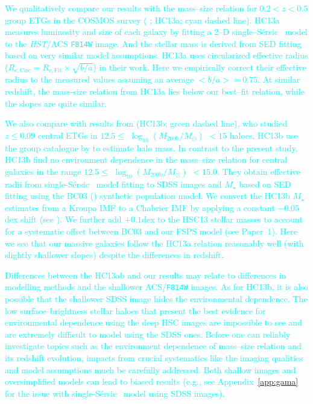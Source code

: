\documentclass[a4paper,fleqn,usenatbib]{mnras}
\def\ser{{S\'{e}rsic\ }}
\def\mstar{{$M_{\star}$}}
\def\logmh{{$\log_{10} (M_{\mathrm{200b}}/M_{\odot})$}}
\newcommand{\song}[1]{\textcolor{cyan}{#1}}
\begin{document}
    \song{
    We qualitatively compare our results with the mass--size relation for 
    $0.2 < z < 0.5$ group ETGs in the COSMOS survey (
    \citealt{HueartasCompany2013b}; HC13a; cyan dashed line).
    HC13a measures luminosity and size of each galaxy by fitting a 2--D 
    single--\ser{} model to the \textit{HST}/ACS \texttt{F814W} image. 
    And the stellar mass is derived from SED fitting based on very similar 
    model assumptions. 
    HC13a uses circularized effective radius 
    ($R_{\mathrm{e,Circ}} = R_{\mathrm{e,Fit}} \times \sqrt{b/a}$) in their work. 
    Here we empirically correct their effective radius to the measured values 
    assuming an average $<b/a>=0.75$.
    At similar redshift, the mass-size relation from HC13a lies below our 
    best--fit relation, while the slopes are quite similar.
    }
    
    \song{
    We also compare with results from \citealt{HCompany13} (HC13b; green dashed line), 
    who studied $z\leq 0.09$ central ETGs in $12.5 \le$ \logmh{} $< 15$ haloes. 
    HC13b use the group catalogue by \citet{Yang2007} to estimate halo mass. 
    In contrast to the present study, HC13b find no environment dependence in the 
    mass--size relation for central galaxies in the range $12.5\le$ \logmh{} $<15.0$. 
    They obtain effective radii from single-\ser{} model fitting to SDSS 
    images and \mstar{} based on SED fitting using the BC03 (\citealt{BC03}) 
    synthetic population model. 
    We convert the HC13b \mstar{} estimates from a Kroupa IMF to a Chabrier 
    IMF by applying a constant $-0.05$ dex shift (see \citealt{Bernardi2016a}). 
    We further add $+0.1$dex to the HSC13 stellar masses to account for a systematic 
    offset between BC03 and our FSPS model (see Paper~1). 
    Here we see that our massive galaxies follow the HC13a relation reasonably well
    (with slightly shallower slopes) despite the differences in redshift. 
    }
    
    \song{
    Differences between the HC13ab and our results may relate to differences 
    in modelling methods and the shallower ACS/\texttt{F814W} images. 
    As for HC13b, it is also possible that the shallower SDSS image hides the
    environmental dependence.  
    The low surface--brightness stellar haloes that present the best evidence for 
    environmental dependence using the deep HSC images are impossible to see and 
    are extremely difficult to model using the SDSS ones. 
    Before one can reliably investigate topics such as the environment dependence 
    of mass--size relation and its redshift evolution, impacts from crucial systematics 
    like the imaging qualities and model assumptions much be carefully addressed. 
    Both shallow images and oversimplified models can lead to biased results 
    (e.g., see Appendix~\ref{app:gama} for the issue with single-\ser{} model 
    using SDSS images).
    }
\end{document}
